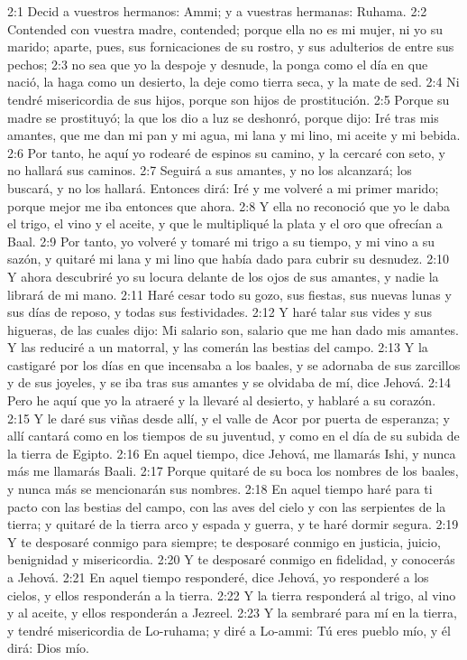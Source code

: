 	2:1 Decid a vuestros hermanos: Ammi; y a vuestras hermanas: Ruhama. 
	2:2 Contended con vuestra madre, contended; porque ella no es mi mujer, ni yo su marido; aparte, pues, sus fornicaciones de su rostro, y sus adulterios de entre sus pechos; 
	2:3 no sea que yo la despoje y desnude, la ponga como el día en que nació, la haga como un desierto, la deje como tierra seca, y la mate de sed. 
	2:4 Ni tendré misericordia de sus hijos, porque son hijos de prostitución. 
	2:5 Porque su madre se prostituyó; la que los dio a luz se deshonró, porque dijo: Iré tras mis amantes, que me dan mi pan y mi agua, mi lana y mi lino, mi aceite y mi bebida. 
	2:6 Por tanto, he aquí yo rodearé de espinos su camino, y la cercaré con seto, y no hallará sus caminos. 
	2:7 Seguirá a sus amantes, y no los alcanzará; los buscará, y no los hallará. Entonces dirá: Iré y me volveré a mi primer marido; porque mejor me iba entonces que ahora. 
	2:8 Y ella no reconoció que yo le daba el trigo, el vino y el aceite, y que le multipliqué la plata y el oro que ofrecían a Baal. 
	2:9 Por tanto, yo volveré y tomaré mi trigo a su tiempo, y mi vino a su sazón, y quitaré mi lana y mi lino que había dado para cubrir su desnudez. 
	2:10 Y ahora descubriré yo su locura delante de los ojos de sus amantes, y nadie la librará de mi mano. 
	2:11 Haré cesar todo su gozo, sus fiestas, sus nuevas lunas y sus días de reposo, y todas sus festividades. 
	2:12 Y haré talar sus vides y sus higueras, de las cuales dijo: Mi salario son, salario que me han dado mis amantes. Y las reduciré a un matorral, y las comerán las bestias del campo. 
	2:13 Y la castigaré por los días en que incensaba a los baales, y se adornaba de sus zarcillos y de sus joyeles, y se iba tras sus amantes y se olvidaba de mí, dice Jehová. 
	2:14 Pero he aquí que yo la atraeré y la llevaré al desierto, y hablaré a su corazón. 
	2:15 Y le daré sus viñas desde allí, y el valle de Acor por puerta de esperanza; y allí cantará como en los tiempos de su juventud, y como en el día de su subida de la tierra de Egipto. 
	2:16 En aquel tiempo, dice Jehová, me llamarás Ishi, y nunca más me llamarás Baali. 
	2:17 Porque quitaré de su boca los nombres de los baales, y nunca más se mencionarán sus nombres. 
	2:18 En aquel tiempo haré para ti pacto con las bestias del campo, con las aves del cielo y con las serpientes de la tierra; y quitaré de la tierra arco y espada y guerra, y te haré dormir segura. 
	2:19 Y te desposaré conmigo para siempre; te desposaré conmigo en justicia, juicio, benignidad y misericordia. 
	2:20 Y te desposaré conmigo en fidelidad, y conocerás a Jehová. 
	2:21 En aquel tiempo responderé, dice Jehová, yo responderé a los cielos, y ellos responderán a la tierra. 
	2:22 Y la tierra responderá al trigo, al vino y al aceite, y ellos responderán a Jezreel. 
	2:23 Y la sembraré para mí en la tierra, y tendré misericordia de Lo-ruhama; y diré a Lo-ammi: Tú eres pueblo mío, y él dirá: Dios mío. 
